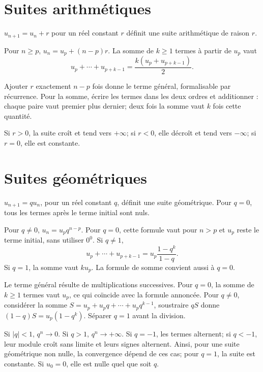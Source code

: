 \section{Suites arithmétiques}
\begin{definition}$u_{n+1}=u_n+r$ pour un réel constant $r$ définit une suite arithmétique de raison $r$.\end{definition}
\begin{propriete}Pour $n\ge p$, $u_n=u_p+(n-p)r$. La somme de $k\ge1$ termes à partir de $u_p$ vaut
\[
 u_p+\cdots+u_{p+k-1}=\frac{k(u_p+u_{p+k-1})}{2}.
\]
\end{propriete}
\begin{demonstration}Ajouter $r$ exactement $n-p$ fois donne le terme général, formalisable par récurrence. Pour la somme, écrire les termes dans les deux ordres et additionner : chaque paire vaut premier plus dernier; deux fois la somme vaut $k$ fois cette quantité.\end{demonstration}
Si $r>0$, la suite croît et tend vers $+\infty$; si $r<0$, elle décroît et tend vers $-\infty$; si $r=0$, elle est constante.
\section{Suites géométriques}
\begin{definition}$u_{n+1}=qu_n$, pour un réel constant $q$, définit une suite géométrique. Pour $q=0$, tous les termes après le terme initial sont nuls.\end{definition}
\begin{propriete}Pour $q\ne0$, $u_n=u_pq^{n-p}$. Pour $q=0$, cette formule vaut pour $n>p$ et $u_p$ reste le terme initial, sans utiliser $0^0$. Si $q\ne1$,
\[
 u_p+\cdots+u_{p+k-1}=u_p\frac{1-q^k}{1-q}.
\]
Si $q=1$, la somme vaut $ku_p$. La formule de somme convient aussi à $q=0$.
\end{propriete}
\begin{demonstration}Le terme général résulte de multiplications successives. Pour $q=0$, la somme de $k\ge1$ termes vaut $u_p$, ce qui coïncide avec la formule annoncée. Pour $q\ne0$, considérer la somme $S=u_p+u_pq+\cdots+u_pq^{k-1}$, soustraire $qS$ donne $(1-q)S=u_p(1-q^k)$. Séparer $q=1$ avant la division.\end{demonstration}
\begin{propriete}
Si $|q|<1$, $q^n\to0$. Si $q>1$, $q^n\to+\infty$. Si $q=-1$, les termes alternent; si $q<-1$, leur module croît sans limite et leurs signes alternent. Ainsi, pour une suite géométrique non nulle, la convergence dépend de ces cas; pour $q=1$, la suite est constante. Si $u_0=0$, elle est nulle quel que soit $q$.
\end{propriete}
